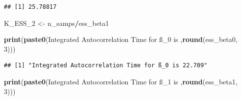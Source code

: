 \documentclass[
]{article}
\newenvironment{Shaded}{\begin{snugshade}}{\end{snugshade}}
\newcommand{\AttributeTok}[1]{\textcolor[rgb]{0.13,0.29,0.53}{#1}}
\newcommand{\CommentTok}[1]{\textcolor[rgb]{0.56,0.35,0.01}{\textit{#1}}}
\newcommand{\DecValTok}[1]{\textcolor[rgb]{0.00,0.00,0.81}{#1}}
\newcommand{\FunctionTok}[1]{\textcolor[rgb]{0.13,0.29,0.53}{\textbf{#1}}}
\newcommand{\NormalTok}[1]{#1}
\newcommand{\OtherTok}[1]{\textcolor[rgb]{0.56,0.35,0.01}{#1}}
\newcommand{\SpecialCharTok}[1]{\textcolor[rgb]{0.81,0.36,0.00}{\textbf{#1}}}
\newcommand{\StringTok}[1]{\textcolor[rgb]{0.31,0.60,0.02}{#1}}
\begin{document}
\begin{Shaded}
\end{Shaded}

\begin{verbatim}
## [1] 25.78817
\end{verbatim}

\begin{Shaded}
\begin{Highlighting}[]
\NormalTok{K\_ESS\_2 }\OtherTok{\textless{}{-}}\NormalTok{ n\_samps}\SpecialCharTok{/}\NormalTok{ess\_beta1}

\FunctionTok{print}\NormalTok{(}\FunctionTok{paste0}\NormalTok{(}\StringTok{\textquotesingle{}Integrated Autocorrelation Time for ß\_0 is \textquotesingle{}}\NormalTok{,}\FunctionTok{round}\NormalTok{(ess\_beta0, }\DecValTok{3}\NormalTok{)))}
\end{Highlighting}
\end{Shaded}

\begin{verbatim}
## [1] "Integrated Autocorrelation Time for ß_0 is 22.709"
\end{verbatim}

\begin{Shaded}
\begin{Highlighting}[]
\FunctionTok{print}\NormalTok{(}\FunctionTok{paste0}\NormalTok{(}\StringTok{\textquotesingle{}Integrated Autocorrelation Time for ß\_1 is \textquotesingle{}}\NormalTok{,}\FunctionTok{round}\NormalTok{(ess\_beta1, }\DecValTok{3}\NormalTok{)))}
\end{Highlighting}
\end{Shaded}
\end{document}
